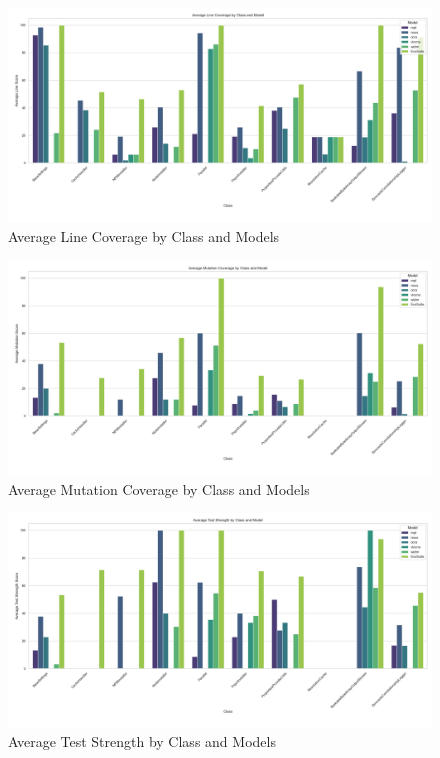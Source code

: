\begin{figure}[H]
\centering
\includegraphics[width=1\textwidth]{images/line_coverage.png}
\caption{Average Line Coverage by Class and Models}
\label{fig:line_coverage}
\end{figure}

\begin{figure}[H]
\centering
\includegraphics[width=1\textwidth]{images/mutation_coverage.png}
\caption{Average Mutation Coverage by Class and Models}
\label{fig:mutation_coverage}
\end{figure}

\begin{figure}[H]
\centering
\includegraphics[width=1\textwidth]{images/test_strength.png}
\caption{Average Test Strength by Class and Models}
\label{fig:test_strength}
\end{figure}

